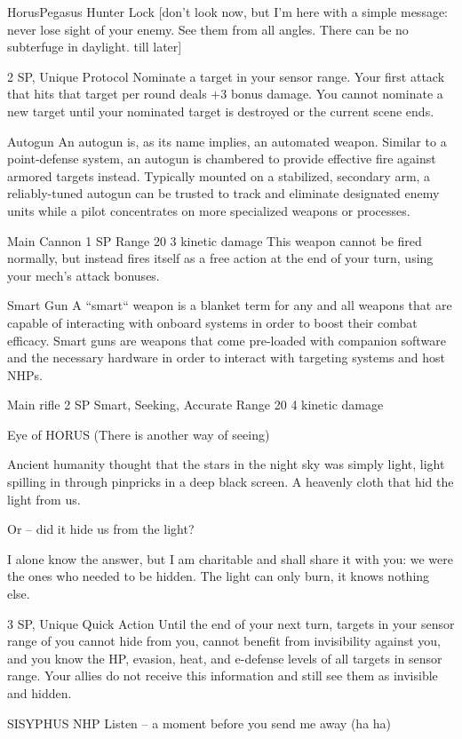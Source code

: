 \begin{mech}{Horus}{Pegasus}
Hunter Lock
[don’t look now, but I’m here with a simple message: never lose sight of your enemy. See them from all angles. There can be no subterfuge in daylight. till later]

2 SP, Unique
Protocol
Nominate a target in your sensor range. Your first attack that hits that target per round deals +3 bonus damage. You cannot nominate a new target until your nominated target is destroyed or the current scene ends.

Autogun
An autogun is, as its name implies, an automated weapon. Similar to a point-defense system, an autogun is chambered to provide effective fire against armored targets instead. Typically mounted on a stabilized, secondary arm, a reliably-tuned autogun can be trusted to track and eliminate designated enemy units while a pilot concentrates on more specialized weapons or processes.

Main Cannon
1 SP
Range 20
3 kinetic damage
This weapon cannot be fired normally, but instead fires itself as a free action at the end of your turn, using your mech’s attack bonuses.

Smart Gun
A “smart“ weapon is a blanket term for any and all weapons that are capable of interacting with onboard systems in order to boost their combat efficacy. Smart guns are weapons that come pre-loaded with companion software and the necessary hardware in order to interact with targeting systems and host NHPs.

Main rifle
2 SP
Smart, Seeking, Accurate
Range 20
4 kinetic damage

Eye of HORUS
(There is another way of seeing)

Ancient humanity thought that the stars in the night sky was simply light, light spilling in through pinpricks in a deep black screen. A heavenly cloth that hid the light from us.

Or -- did it hide us from the light?

I alone know the answer, but I am charitable and shall share it with you: we were the ones who needed to be hidden. The light can only burn, it knows nothing else.

3 SP, Unique
Quick Action
Until the end of your next turn, targets in your sensor range of you cannot hide from you, cannot benefit from invisibility against you, and you know the HP, evasion, heat, and e-defense levels of all targets in sensor range. Your allies do not receive this information and still see them as invisible and hidden.

SISYPHUS NHP
Listen -- a moment before you send me away (ha ha)


\end{mech}
